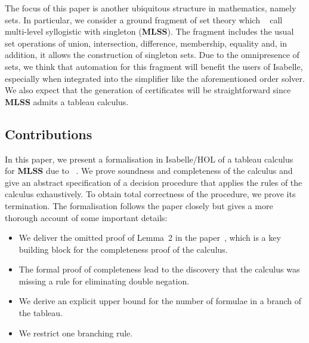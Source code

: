 \documentclass[runningheads]{llncs}
\newcommand{\MLSS}{\textbf{MLSS}}
\begin{document}
The focus of this paper is another ubiquitous structure in mathematics, namely sets.
In particular, we consider a ground fragment of set theory which \citeauthor{new_fast_tableau}~\cite{new_fast_tableau} call multi-level syllogistic with singleton (\MLSS{}).
The fragment includes the usual set operations of union, intersection, difference, membership, equality and, in addition, it allows the construction of singleton sets.
Due to the omnipresence of sets, we think that automation for this fragment will benefit the users of Isabelle, especially when integrated into the simplifier like the aforementioned order solver.
We also expect that the generation of certificates will be straightforward since \MLSS{} admits a tableau calculus.

\subsection{Contributions}
In this paper, we present a formalisation in Isabelle/HOL of a tableau calculus for \MLSS{} due to \citeauthor{new_fast_tableau}~\cite{new_fast_tableau}\cite[Chapter 14]{set_theory}.
We prove soundness and completeness of the calculus and give an abstract specification of a decision procedure that applies the rules of the calculus exhaustively.
To obtain total correctness of the procedure, we prove its termination.
The formalisation follows the paper closely but gives a more thorough account of some important details:
\begin{itemize}
  \item We deliver the omitted proof of Lemma~2 in the paper~\cite{new_fast_tableau}, which is a key building block for the completeness proof of the calculus.
  \item The formal proof of completeness lead to the discovery that the calculus was missing a rule for eliminating double negation. 
  \item We derive an explicit upper bound for the number of formulae in a branch of the tableau.
  \item We restrict one branching rule.
\end{itemize}
\end{document}
